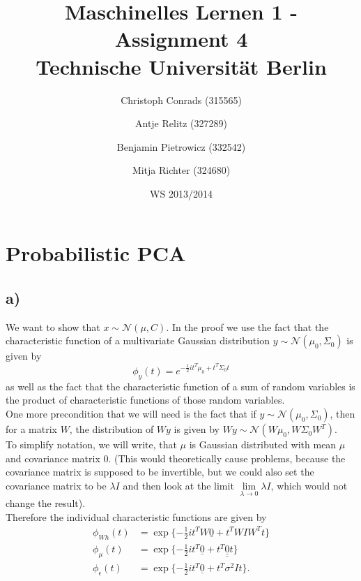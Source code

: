 \documentclass[paper=a4,fontsize=10pt,DIV11,BCOR10mm]{scrartcl}
\begin{document}
\title{Maschinelles Lernen 1 - Assignment 4\\
\small{Technische Universität Berlin}}


\author{\small{Christoph Conrads (315565)}\and \small{Antje Relitz (327289)}  \and \small{Benjamin Pietrowicz (332542)} \and \small{Mitja Richter (324680)} }

\date{WS 2013/2014}

\maketitle


\section*{Probabilistic PCA}
\subsection*{a)}
We want to show that $x \sim \mathcal{N}(\mu,C)$. In the proof we use the fact that the characteristic function of a multivariate Gaussian distribution $y \sim \mathcal{N}(\mu_0,\Sigma_0)$ is given by 
\begin{equation*}
\phi_y(t)=e^{-\frac{1}{2}i t^T \mu_0 + t^T \Sigma_0 t}
\end{equation*}
as well as the fact that the characteristic function of a sum of random variables is the product of characteristic functions of those random variables.\\

One more precondition that we will need is the fact that if $y \sim \mathcal{N}(\mu_0,\Sigma_0)$, then for a matrix $W$, the distribution of $Wy$ is given by $Wy \sim \mathcal{N}(W\mu_0,W\Sigma_0W^T)$.\\

To simplify notation, we will write, that $\mu$ is Gaussian distributed with mean $\mu$ and covariance matrix \underline{\underline{$0$}}. (This would theoretically cause problems, because the covariance matrix is supposed to be invertible, but we could also set the covariance matrix to be $\lambda I$ and then look at the limit $\lim\limits_{\lambda \rightarrow 0}\lambda I$, which would not change the result).\\

Therefore the individual characteristic functions are given by
\begin{align*}
\phi_{Wh}(t) &= \exp\{{-\frac{1}{2}i t^T W\underline{0} + t^T W I W^T t}\}\\
\phi_\mu(t) &= \exp\{{-\frac{1}{2}i t^T \underline{0} + t^T \underline{\underline{0}} t}\}\\
\phi_\epsilon(t) &= \exp \{{-\frac{1}{2}i t^T \underline{0} + t^T \sigma^2 I t}\}\text{.}\\
\end{align*}
\end{document}
